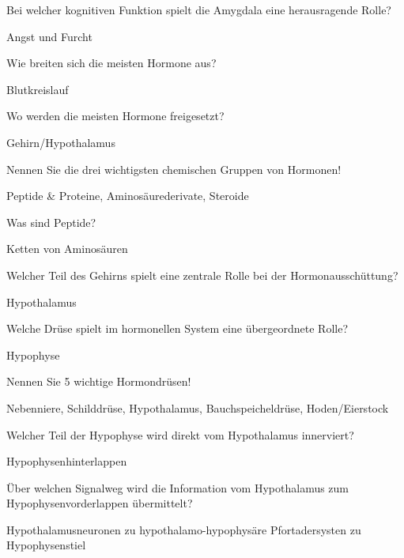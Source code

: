 \documentclass[10pt, a4paper]{exam}
\begin{document}
\begin{questions}
  \question Bei welcher kognitiven Funktion spielt die Amygdala eine herausragende Rolle?
  \begin{solution}
    Angst und Furcht
  \end{solution}

  \question Wie breiten sich die meisten Hormone aus?
  \begin{solution}
    Blutkreislauf
  \end{solution}

  \question Wo werden die meisten Hormone freigesetzt?
  \begin{solution}
    Gehirn/Hypothalamus
  \end{solution}

  \question Nennen Sie die drei wichtigsten chemischen Gruppen von Hormonen!
  \begin{solution}
    Peptide \& Proteine, Aminosäurederivate, Steroide
  \end{solution}

  \question Was sind Peptide?
  \begin{solution}
    Ketten von Aminosäuren
  \end{solution}

  \question Welcher Teil des Gehirns spielt eine zentrale Rolle bei der Hormonausschüttung?
  \begin{solution}
    Hypothalamus
  \end{solution}

  \question Welche Drüse spielt im hormonellen System eine übergeordnete Rolle?
  \begin{solution}
    Hypophyse
  \end{solution}

  \question Nennen Sie 5 wichtige Hormondrüsen!
  \begin{solution}
    Nebenniere, Schilddrüse, Hypothalamus, Bauchspeicheldrüse, Hoden/Eierstock
  \end{solution}

  \question Welcher Teil der Hypophyse wird direkt vom Hypothalamus innerviert?
  \begin{solution}
    Hypophysenhinterlappen
  \end{solution}

  \question Über welchen Signalweg wird die Information vom Hypothalamus zum Hypophysenvorderlappen übermittelt?
  \begin{solution}
    Hypothalamusneuronen zu hypothalamo-hypophysäre Pfortadersysten zu Hypophysenstiel
  \end{solution}


\end{questions}
\end{document}
